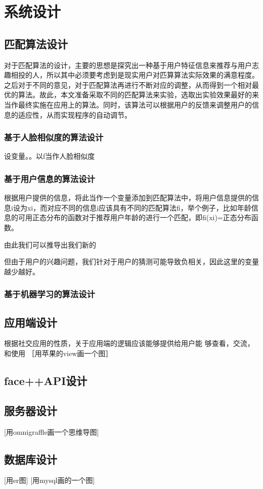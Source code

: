 
\chapter{系统设计}

\section{匹配算法设计}
对于匹配算法的设计，主要的思想是探究出一种基于用户特征信息来推荐与用户志趣相投的人，所以其中必须要考虑到是现实用户对匹算算法实际效果的满意程度。之后对于不同的意见，对于匹配算法再进行不断对应的调整，从而得到一个相对最优的算法。故此，本文准备采取不同的匹配算法来实验，选取出实验效果最好的来当作最终实施在应用上的算法。同时，该算法可以根据用户的反馈来调整用户的信息的适应性，从而实现程序的自动调节。
\subsection{基于人脸相似度的算法设计}
设变量。。以f当作人脸相似度
\subsection{基于用户信息的算法设计}
根据用户提供的信息，将此当作一个变量添加到匹配算法中，将用户信息提供的信息i设为xi，而对应不同的信息i应该具有不同的匹配算法fi，举个例子，比如年龄信息的可用正态分布的函数对于推荐用户年龄的进行一个匹配，即fi(xi)=正态分布函数。

由此我们可以推导出我们新的

但由于用户的兴趣问题，我们针对于用户的猜测可能导致负相关，因此这里的变量越少越好。
\subsection{基于机器学习的算法设计}

\section{应用端设计}

根据社交应用的性质，关于应用端的逻辑应该能够提供给用户能 够查看，交流，和使用
［用苹果的view画一个图］

\section{face++API设计}


\section{服务器设计}
[用omnigraffle画一个思维导图]


\section{数据库设计}

[用er图]
[用mysql画的一个图]




